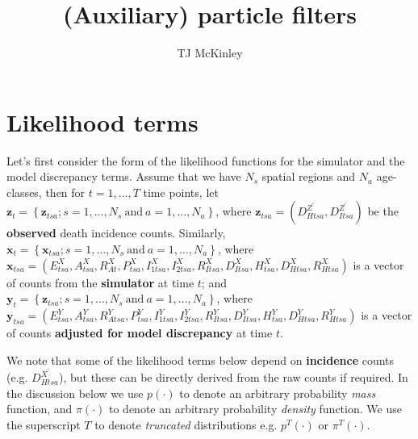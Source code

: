 \documentclass[a4paper]{article}
\title{(Auxiliary) particle filters}
\author{TJ McKinley}
\date{}
\newcommand{\bx}{\bm{x}}
\newcommand{\by}{\bm{y}}
\newcommand{\bz}{\bm{z}}
\begin{document}
\maketitle

\section{Likelihood terms}

Let's first consider the form of the likelihood functions for the simulator and the model discrepancy terms. Assume that we have $N_s$ spatial regions and $N_a$ age-classes, then for $t = 1, \dots, T$ time points, let $\bz_t = \left\{\bz_{tsa}; s = 1, \dots, N_s~\mbox{and}~a = 1, \dots, N_a\right\}$, where $\bz_{tsa} = \left(D^{Z^\prime}_{Htsa}, D^{Z^\prime}_{Itsa}\right)$ be the \textbf{observed} death incidence counts. Similarly,  $\bx_t = \left\{\bx_{tsa}; s = 1, \dots, N_s~\mbox{and}~a = 1, \dots, N_a\right\}$, where \newline
$\bx_{tsa} = \left(E^X_{tsa}, A^X_{tsa}, R^X_{At}, P^X_{tsa}, I^X_{1tsa}, I^X_{2tsa}, R^X_{Itsa}, D^X_{Itsa}, H^X_{tsa}, D^X_{Htsa}, R^X_{Htsa}\right)$ is a vector of counts from the \textbf{simulator} at time $t$; and $\by_t = \left\{\bz_{tsa}; s = 1, \dots, N_s~\mbox{and}~a = 1, \dots, N_a\right\}$, where \newline $\by_{tsa} = \left(E^Y_{tsa}, A^Y_{tsa}, R^Y_{Atsa}, P^Y_{tsa}, I^Y_{1tsa}, I^Y_{2tsa}, R^Y_{Itsa}, D^Y_{Itsa}, H^Y_{tsa}, D^Y_{Htsa}, R^Y_{Htsa}\right)$ is a vector of counts \textbf{adjusted for model discrepancy} at time $t$. 

We note that some of the likelihood terms below depend on \textbf{incidence} counts (e.g. $D^{X^\prime}_{Htsa}$), but these can be directly derived from the raw counts if required. In the discussion below we use $p\left(\cdot\right)$ to denote an arbitrary probability \textit{mass} function, and $\pi\left(\cdot\right)$ to denote an arbitrary probability \textit{density} function. We use the superscript $T$ to denote \textit{truncated} distributions e.g. $p^T\left(\cdot\right)$ or $\pi^T\left(\cdot\right)$. 
\end{document}
